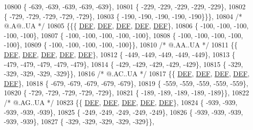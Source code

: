 \begin{DoxyCode}
10800 \{ -639, -639, -639, -639, -639\},
10801 \{ -229, -229, -229, -229, -229\},
10802 \{ -729, -729, -729, -729, -729\},
10803 \{ -190, -190, -190, -190, -190\}\}\},
10804 \textcolor{comment}{/*  @.A@..UA */}
10805 \{\{\{  \mbox{\hyperlink{1_88_84__epars_8h_a397419fc12b37ed479c8abb9d444d843}{DEF}},  \mbox{\hyperlink{1_88_84__epars_8h_a397419fc12b37ed479c8abb9d444d843}{DEF}},  \mbox{\hyperlink{1_88_84__epars_8h_a397419fc12b37ed479c8abb9d444d843}{DEF}},  \mbox{\hyperlink{1_88_84__epars_8h_a397419fc12b37ed479c8abb9d444d843}{DEF}},  \mbox{\hyperlink{1_88_84__epars_8h_a397419fc12b37ed479c8abb9d444d843}{DEF}}\},
10806 \{ -100, -100, -100, -100, -100\},
10807 \{ -100, -100, -100, -100, -100\},
10808 \{ -100, -100, -100, -100, -100\},
10809 \{ -100, -100, -100, -100, -100\}\},
10810 \textcolor{comment}{/*  @.AA..UA */}
10811 \{\{  \mbox{\hyperlink{1_88_84__epars_8h_a397419fc12b37ed479c8abb9d444d843}{DEF}},  \mbox{\hyperlink{1_88_84__epars_8h_a397419fc12b37ed479c8abb9d444d843}{DEF}},  \mbox{\hyperlink{1_88_84__epars_8h_a397419fc12b37ed479c8abb9d444d843}{DEF}},  \mbox{\hyperlink{1_88_84__epars_8h_a397419fc12b37ed479c8abb9d444d843}{DEF}},  \mbox{\hyperlink{1_88_84__epars_8h_a397419fc12b37ed479c8abb9d444d843}{DEF}}\},
10812 \{ -449, -449, -449, -449, -449\},
10813 \{ -479, -479, -479, -479, -479\},
10814 \{ -429, -429, -429, -429, -429\},
10815 \{ -329, -329, -329, -329, -329\}\},
10816 \textcolor{comment}{/*  @.AC..UA */}
10817 \{\{  \mbox{\hyperlink{1_88_84__epars_8h_a397419fc12b37ed479c8abb9d444d843}{DEF}},  \mbox{\hyperlink{1_88_84__epars_8h_a397419fc12b37ed479c8abb9d444d843}{DEF}},  \mbox{\hyperlink{1_88_84__epars_8h_a397419fc12b37ed479c8abb9d444d843}{DEF}},  \mbox{\hyperlink{1_88_84__epars_8h_a397419fc12b37ed479c8abb9d444d843}{DEF}},  \mbox{\hyperlink{1_88_84__epars_8h_a397419fc12b37ed479c8abb9d444d843}{DEF}}\},
10818 \{ -679, -679, -679, -679, -679\},
10819 \{ -559, -559, -559, -559, -559\},
10820 \{ -729, -729, -729, -729, -729\},
10821 \{ -189, -189, -189, -189, -189\}\},
10822 \textcolor{comment}{/*  @.AG..UA */}
10823 \{\{  \mbox{\hyperlink{1_88_84__epars_8h_a397419fc12b37ed479c8abb9d444d843}{DEF}},  \mbox{\hyperlink{1_88_84__epars_8h_a397419fc12b37ed479c8abb9d444d843}{DEF}},  \mbox{\hyperlink{1_88_84__epars_8h_a397419fc12b37ed479c8abb9d444d843}{DEF}},  \mbox{\hyperlink{1_88_84__epars_8h_a397419fc12b37ed479c8abb9d444d843}{DEF}},  \mbox{\hyperlink{1_88_84__epars_8h_a397419fc12b37ed479c8abb9d444d843}{DEF}}\},
10824 \{ -939, -939, -939, -939, -939\},
10825 \{ -249, -249, -249, -249, -249\},
10826 \{ -939, -939, -939, -939, -939\},
10827 \{ -329, -329, -329, -329, -329\}\},

\end{DoxyCode}
